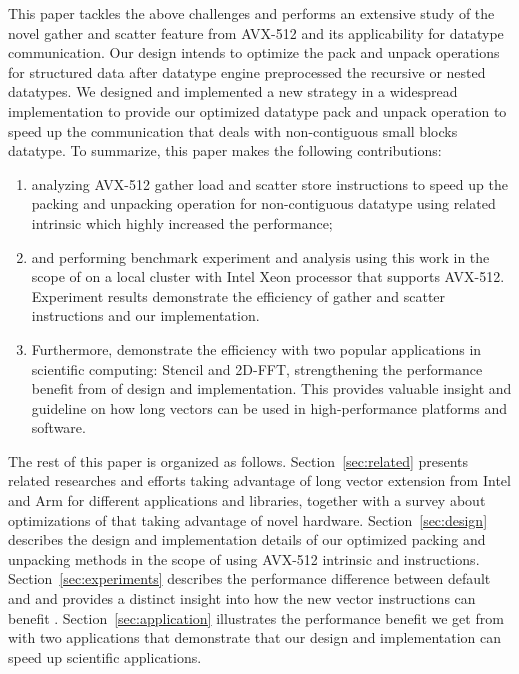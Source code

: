 \documentclass[conference]{IEEEtran}
\begin{document}
This paper tackles the above challenges and performs an extensive study of
the novel gather and scatter feature from AVX-512 and its applicability
for \mpi datatype communication. Our design intends to optimize the pack and unpack operations for structured data
after datatype engine preprocessed the recursive or nested datatypes.
We designed and implemented
a new strategy in a widespread \mpi implementation \ompi to provide our optimized \mpi datatype
pack and unpack operation to speed up the communication that deals with non-contiguous small blocks datatype. To summarize, this paper makes
the following contributions:
\begin{enumerate}
  \item analyzing AVX-512 gather load and scatter store instructions to speed up the packing and unpacking operation for non-contiguous datatype using related intrinsic which highly increased the performance;
  \item and performing benchmark experiment and analysis using this work
      in the scope of \ompi on a local cluster with Intel Xeon processor that supports AVX-512.
      Experiment results demonstrate the efficiency of gather and scatter instructions and our implementation.
  \item Furthermore, demonstrate the efficiency with two popular applications in
  scientific computing: Stencil and 2D-FFT, strengthening the performance
  benefit from of design and implementation. This provides valuable insight
  and guideline on how long vectors can be used in high-performance platforms and software.
\end{enumerate}

The rest of this paper is organized as follows.
Section~\ref{sec:related} presents related researches and efforts taking advantage of long vector extension from Intel and Arm for different applications and libraries, together with a survey about optimizations of \mpi that taking advantage of novel hardware.
Section~\ref{sec:design} describes the design and implementation details of our optimized packing and unpacking methods in the scope of \ompi using AVX-512 intrinsic and instructions.
Section~\ref{sec:experiments} describes the performance difference between default \ompi and \ourwork and provides a distinct insight into how the new vector instructions can benefit \mpi.
Section~\ref{sec:application} illustrates the performance benefit we get from \ourwork with two applications that demonstrate that our design and implementation can speed up scientific applications.
\end{document}
